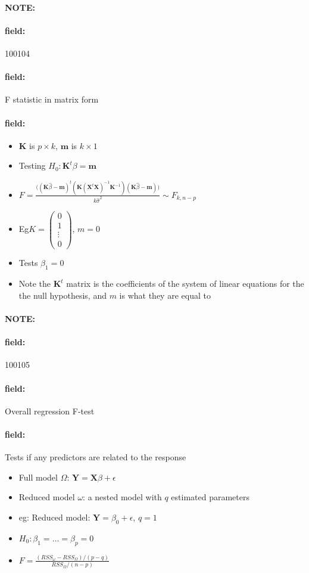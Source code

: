 \documentclass[12pt]{article}
\newenvironment{note}{\paragraph{NOTE:}}{}
\newenvironment{field}{\paragraph{field:}}{}
\begin{document}
\begin{note} \begin{field} \tiny 100104 \end{field}
 \begin{field}
  F statistic in matrix form
 \end{field}
 \begin{field}
  \begin{itemize}
   \item $\mathbf{K}$  is $p\times k$, $\mathbf{m}$ is $k\times 1$
   \item Testing $H_0: \mathbf{K}^t\beta = \mathbf{m}$
   \item $F = \frac{\big((\mathbf{K}\hat{\beta} - \mathbf{m})^t (\mathbf{K}(\mathbf{X}^t \mathbf{X})^{-1}\mathbf{K}^{-1})(\mathbf{K}\hat{\beta} - \mathbf{m})\big)}{k\hat{\sigma}^2} \sim F_{k,n-p}$
   \item Eg$K = \begin{pmatrix}
           0 \\ 1 \\ \vdots \\ 0
          \end{pmatrix}$, $m = 0$
   \item Tests $\beta_1 = 0$
   \item Note the $\mathbf{K}^t$ matrix is the coefficients of the system of linear equations for the the null hypothesis, and $m$ is what they are equal to
  \end{itemize}
 \end{field}
\end{note}

\begin{note} \begin{field} \tiny 100105 \end{field}
 \begin{field}
  Overall regression F-test
 \end{field}
 \begin{field}
  Tests if any predictors are related to the response
  \begin{itemize}
   \item Full model $\Omega$: $\mathbf{Y} = \mathbf{X}\beta + \epsilon$
   \item Reduced model $\omega$: a nested model with $q$ estimated parameters
   \item eg: Reduced model: $\mathbf{Y} = \beta_0 + \epsilon$, $q = 1$
   \item $H_0: \beta_1 =  \ldots = \beta_p = 0$
   \item $F = \frac{(RSS_\omega - RSS_\Omega)/(p-q)}{RSS_\Omega/(n-p)}$
  \end{itemize}
 \end{field}
\end{note}
\end{document}
